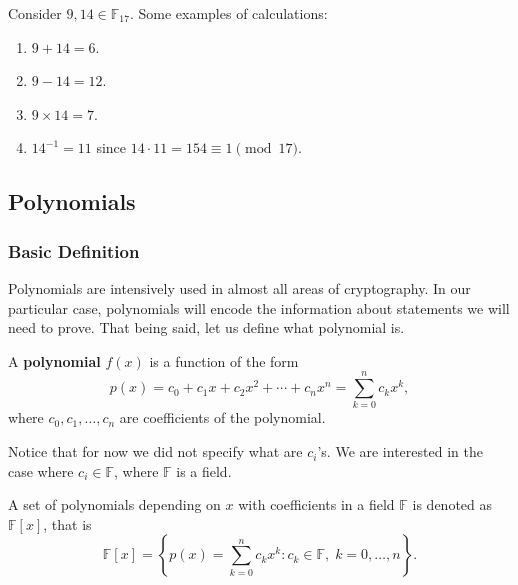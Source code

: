 \documentclass[../lecture-notes.tex]{subfiles}
\begin{document}
\begin{example}
    Consider $9, 14 \in \mathbb{F}_{17}$. Some examples of calculations:
    \begin{enumerate}
        \item $9+14 = 6$.
        \item $9-14 = 12$.
        \item $9 \times 14 = 7$.
        \item $14^{-1} = 11$ since $14 \cdot 11 = 154 \equiv 1 \pmod{17}$.
    \end{enumerate}
\end{example}


\subsection{Polynomials}\label{section:polynomials}

\subsubsection{Basic Definition}

Polynomials are intensively used in almost all areas of cryptography. In our particular case, polynomials will encode the information about
statements we will need to prove. That being said, let us define what polynomial is.

\begin{definition}
    A \textbf{polynomial} $f(x)$ is a function of the form
    \begin{equation*}
        p(x) = c_0 + c_1 x + c_2 x^2 + \cdots + c_n x^n = \sum_{k=0}^{n} c_k x^k,
    \end{equation*}
    where $c_0, c_1, \dots, c_n$ are coefficients of the polynomial.
\end{definition}

Notice that for now we did not specify what are $c_i$'s. We are interested in the case where $c_i \in \mathbb{F}$, where $\mathbb{F}$ is a field. 

\begin{definition}
    A set of polynomials depending on $x$ with coefficients in a field $\mathbb{F}$ is denoted as $\mathbb{F}[x]$, that is
    \begin{equation*}
        \mathbb{F}[x] = \left\{p(x) = \sum_{k=0}^{n} c_k x^k: c_k \in \mathbb{F}, \; k = 0,\dots,n\right\}.
    \end{equation*}
\end{definition}
\end{document}

